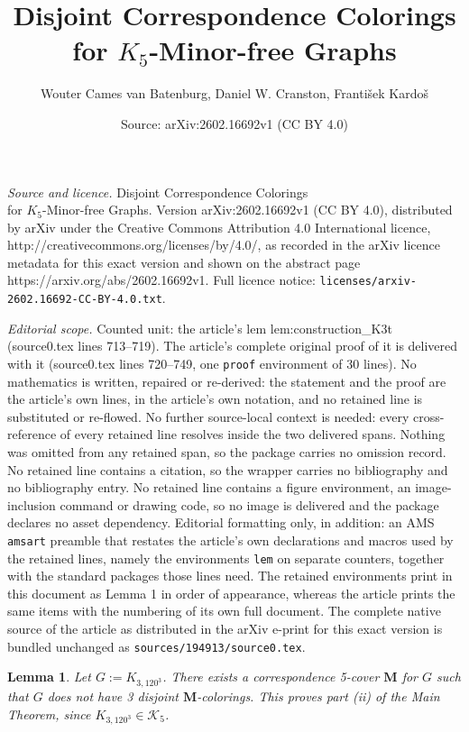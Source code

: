 \documentclass[10pt,a4paper]{amsart}
\title{Disjoint Correspondence Colorings\\ for $K_5$-Minor-free Graphs}
\author{Wouter Cames van Batenburg, Daniel W. Cranston, Franti\v{s}ek Kardo\v{s}}
\date{Source: arXiv:2602.16692v1 (CC BY 4.0)}
\newtheorem{lem}{Lemma}
\newcommand\K{\mathcal{K}}
\newcommand\MM{\textbf{M}}
\begin{document}
\maketitle

\noindent\emph{Source and licence.} Disjoint Correspondence Colorings\\ for $K_5$-Minor-free Graphs. Version arXiv:2602.16692v1 (CC BY 4.0), distributed by arXiv under the Creative Commons Attribution 4.0 International licence, http://creativecommons.org/licenses/by/4.0/, as recorded in the arXiv licence metadata for this exact version and shown on the abstract page https://arxiv.org/abs/2602.16692v1. Full licence notice: \texttt{licenses/arxiv-2602.16692-CC-BY-4.0.txt}.\par\smallskip

\noindent\textit{Editorial scope.} Counted unit: the article's lem lem:construction\_K3t (source0.tex lines 713--719). The article's complete original proof of it is delivered with it (source0.tex lines 720--749, one \texttt{proof} environment of 30 lines). No mathematics is written, repaired or re-derived: the statement and the proof are the article's own lines, in the article's own notation, and no retained line is substituted or re-flowed.  No further source-local context is needed: every cross-reference of every retained line resolves inside the two delivered spans.  Nothing was omitted from any retained span, so the package carries no omission record.  No retained line contains a citation, so the wrapper carries no bibliography and no bibliography entry.  No retained line contains a figure environment, an image-inclusion command or drawing code, so no image is delivered and the package declares no asset dependency.  Editorial formatting only, in addition: an AMS \texttt{amsart} preamble that restates the article's own declarations and macros used by the retained lines, namely the environments \texttt{lem} on separate counters, together with the standard packages those lines need.  The retained environments print in this document as Lemma 1 in order of appearance, whereas the article prints the same items with the numbering of its own full document.  The complete native source of the article as distributed in the arXiv e-print for this exact version is bundled unchanged as \texttt{sources/194913/source0.tex}.
\begin{lem}\label{lem:construction_K3t}
	\label{part-ii-lem}
	Let $G:=K_{3,120^3}$.  There exists a correspondence 5-cover $\MM$ for $G$ such that $G$ does not
	have 3 disjoint $\MM$-colorings.  This proves part (ii) of the Main Theorem, 
	since $K_{3,120^3}\in \K_5$.
	
\end{lem}
\end{document}

